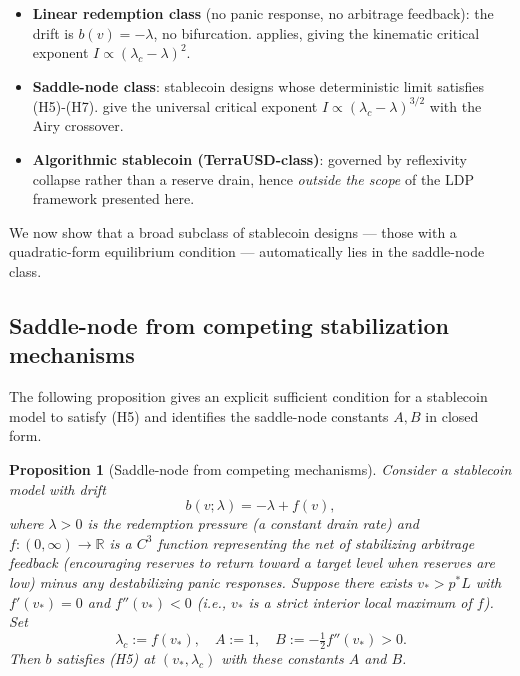 \documentclass[11pt,a4paper]{article}
\theoremstyle{plain}
\newtheorem{proposition}[theorem]{Proposition}
\theoremstyle{definition}
\newcommand{\R}{\mathbb{R}}
\begin{document}
\begin{itemize}
\item \textbf{Linear redemption class} (no panic response, no arbitrage feedback): the drift is $b(v) = -\lambda$, no bifurcation.  applies, giving the kinematic critical exponent $I \propto (\lambda_c-\lambda)^2$.
\item \textbf{Saddle-node class}: stablecoin designs whose deterministic limit satisfies (H5)-(H7).  give the universal critical exponent $I \propto (\lambda_c-\lambda)^{3/2}$ with the Airy crossover.
\item \textbf{Algorithmic stablecoin (TerraUSD-class)}: governed by reflexivity collapse rather than a reserve drain, hence \emph{outside the scope} of the LDP framework presented here.
\end{itemize}

We now show that a broad subclass of stablecoin designs --- those with a quadratic-form equilibrium condition --- automatically lies in the saddle-node class.

\subsection{Saddle-node from competing stabilization mechanisms}

The following proposition gives an explicit sufficient condition for a stablecoin model to satisfy (H5) and identifies the saddle-node constants $A, B$ in closed form.

\begin{proposition}[Saddle-node from competing mechanisms]
\label{prop:saddle-equilibrium}
Consider a stablecoin model with drift
\begin{equation}
b(v;\lambda) = -\lambda + f(v),
\label{eq:drift-class}
\end{equation}
where $\lambda > 0$ is the redemption pressure (a constant drain rate) and $f:(0,\infty)\to\R$ is a $C^3$ function representing the net of stabilizing arbitrage feedback (encouraging reserves to return toward a target level when reserves are low) minus any destabilizing panic responses. Suppose there exists $v_* > p^*L$ with $f'(v_*) = 0$ and $f''(v_*) < 0$ (i.e., $v_*$ is a strict interior local maximum of $f$). Set
$$\lambda_c := f(v_*),\quad A := 1,\quad B := -\tfrac{1}{2}f''(v_*) > 0.$$
Then $b$ satisfies (H5) at $(v_*,\lambda_c)$ with these constants $A$ and $B$.
\end{proposition}
\end{document}
